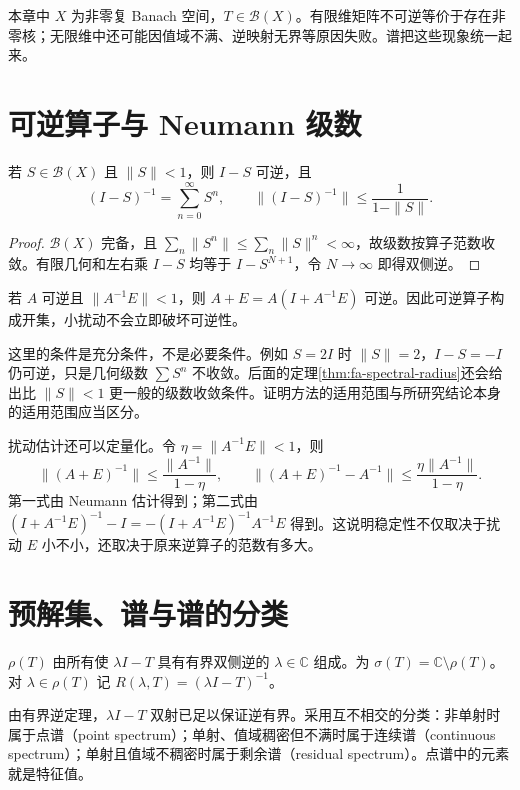 \documentclass[UTF8,12pt,a4paper,fontset=fandol]{ctexbook}
\begin{document}
本章中 $X$ 为非零复 Banach 空间，$T\in\mathcal B(X)$。有限维矩阵不可逆等价于存在非零核；无限维中还可能因值域不满、逆映射无界等原因失败。谱把这些现象统一起来。

\section{可逆算子与 Neumann 级数}
\begin{proposition}\label{prop:fa-neumann}
若 $S\in\mathcal B(X)$ 且 $\|S\|<1$，则 $I-S$ 可逆，且
\begin{equation}
 (I-S)^{-1}=\sum_{n=0}^{\infty}S^n,
 \qquad\|(I-S)^{-1}\|\leq\frac1{1-\|S\|}.
 \label{eq:fa-neumann-series}
\end{equation}
\end{proposition}
\begin{proof}
$\mathcal B(X)$ 完备，且 $\sum_n\|S^n\|\leq\sum_n\|S\|^n<\infty$，故级数按算子范数收敛。有限几何和左右乘 $I-S$ 均等于 $I-S^{N+1}$，令 $N\to\infty$ 即得双侧逆。
\end{proof}
若 $A$ 可逆且 $\|A^{-1}E\|<1$，则 $A+E=A(I+A^{-1}E)$ 可逆。因此可逆算子构成开集，小扰动不会立即破坏可逆性。

这里的条件是充分条件，不是必要条件。例如 $S=2I$ 时 $\|S\|=2$，$I-S=-I$ 仍可逆，只是几何级数 $\sum S^n$ 不收敛。后面的定理\ref{thm:fa-spectral-radius}还会给出比 $\|S\|<1$ 更一般的级数收敛条件。证明方法的适用范围与所研究结论本身的适用范围应当区分。

扰动估计还可以定量化。令 $\eta=\|A^{-1}E\|<1$，则
\[
 \|(A+E)^{-1}\|\leq\frac{\|A^{-1}\|}{1-\eta},\qquad
 \|(A+E)^{-1}-A^{-1}\|
 \leq\frac{\eta\|A^{-1}\|}{1-\eta}.
\]
第一式由 Neumann 估计得到；第二式由 $(I+A^{-1}E)^{-1}-I=-(I+A^{-1}E)^{-1}A^{-1}E$ 得到。这说明稳定性不仅取决于扰动 $E$ 小不小，还取决于原来逆算子的范数有多大。

\section{预解集、谱与谱的分类}
\begin{definition}
$\rho(T)$ 由所有使 $\lambda I-T$ 具有有界双侧逆的 $\lambda\in\mathbb C$ 组成。为 $\sigma(T)=\mathbb C\setminus\rho(T)$。对 $\lambda\in\rho(T)$ 记 $R(\lambda,T)=(\lambda I-T)^{-1}$。
\end{definition}
由有界逆定理，$\lambda I-T$ 双射已足以保证逆有界。采用互不相交的分类：非单射时属于点谱（point spectrum）；单射、值域稠密但不满时属于连续谱（continuous spectrum）；单射且值域不稠密时属于剩余谱（residual spectrum）。点谱中的元素就是特征值。
\end{document}
